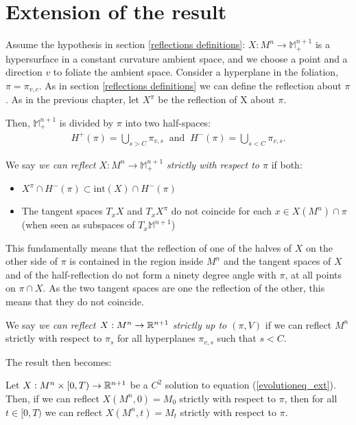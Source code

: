 \section{Extension of the result}	


Assume the hypothesis in section \ref{reflections definitions}: $X:M^n\rightarrow \mathbb{M}^{n+1}_+$ is a hypersurface in a constant curvature ambient space, and we choose a point and a direction $v$ to foliate the ambient space. Consider a hyperplane in the foliation, $\pi=\pi_{v, c}$. As in section \ref{reflections definitions} we can define the reflection about $\pi$. As in the previous chapter, let $X^\pi$ be the reflection of X about $\pi$.

Then, $\mathbb{M}^{n+1}_+$ is divided by $\pi$ into two half-spaces:
\begin{align*}
	H^+(\pi)= \bigcup_{s>C} \pi_{v, s} \;\;\mathrm{and}\;\;	H^-(\pi)= \bigcup_{s<C} \pi_{v, s}.
\end{align*} 

\begin{defin}
	We say {\em we can reflect $X: M^n\rightarrow \mathbb{M}^{n+1}_+$ strictly with respect to $\pi$} if both:
	\begin{itemize}
		\item $X^\pi\cap H^-(\pi)\subset \mathrm{int}(X)\cap H^-(\pi)$ 
		\item The tangent spaces $T_xX$ and $T_xX^\pi$ do not coincide for each $x\in X(M^n) \cap \pi$ (when seen as subspaces of  $T_x\mathbb{M}^{n+1}$)
	\end{itemize} 
\end{defin}
This fundamentally means that the reflection of one of the halves of $X$ on the other side of $\pi$ is contained in the region inside $M^n$ and the tangent spaces of $X$ and of the half-reflection do not form a ninety degree angle with $\pi$, at all points on $\pi\cap X$. As the two tangent spaces are one the reflection of the other, this means that they do not coincide.   
\begin{defin}
	We say {\em we can reflect $X: M^n\rightarrow \mathbb{R}^{n+1}$ strictly up to $(\pi,V)$} if we can reflect $M^n$ strictly with respect to $\pi_s$ for all hyperplanes $\pi_{v, s}$ such that $s<C$.  
\end{defin}

The result then becomes:


\begin{theorem}\label{chow gulliver extended}
	Let $X:M^n\times [0,T) \rightarrow \mathbb{R}^{n+1}$ be a $C^2$ solution to equation (\ref{evolutioneq_ext}). Then, if we can reflect $X(M^n, 0)=M_0$ strictly with respect to $\pi$, then for all $t\in [0,T)$ we can reflect $X(M^n, t)=M_t$ strictly with respect to $\pi$. 
\end{theorem}

